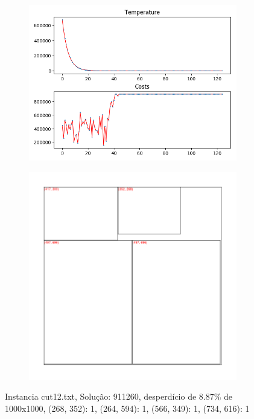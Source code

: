 
\begin{figure}
\centering
\begin{subfigure}{.5\textwidth}
  \centering
  \includegraphics[width=1\linewidth]{results/cut12/2/plot}
  \label{fig:sub1}
\end{subfigure}%
\begin{subfigure}{.5\textwidth}
  \centering
  \includegraphics[width=1\linewidth]{results/cut12/2/cut}
  \label{fig:sub2}
\end{subfigure}
\caption{Instancia cut12.txt, Solução: 911260, desperdício de 8.87\% de 1000x1000, {(268, 352): 1, (264, 594): 1, (566, 349): 1, (734, 616): 1}}
\label{fig:test}
\end{figure}


